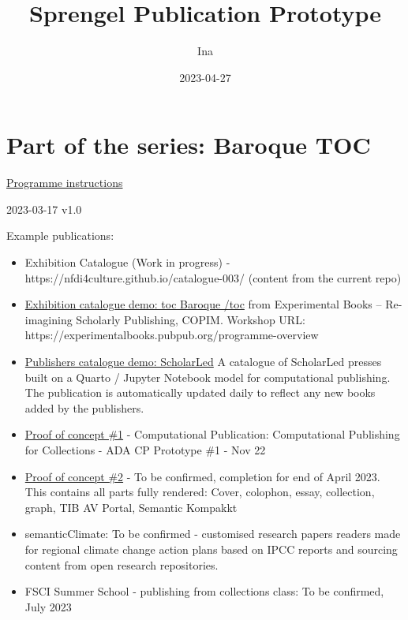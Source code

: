 \documentclass[
  letterpaper,
]{book}
\title{Sprengel Publication Prototype}
\author{Ina}
\date{2023-04-27}
\renewcommand*\contentsname{Table of contents}
\newcommand\contentsname{Table of contents}
\begin{document}
\frontmatter
\maketitle
\ifdefined\Shaded\renewenvironment{Shaded}{\begin{tcolorbox}[boxrule=0pt, frame hidden, interior hidden, breakable, enhanced, sharp corners, borderline west={3pt}{0pt}{shadecolor}]}{\end{tcolorbox}}\fi

\renewcommand*\contentsname{Table of contents}
{
\setcounter{tocdepth}{2}
\tableofcontents
}
\mainmatter
{}

\hypertarget{part-of-the-series-baroque-toc}{%
\chapter{Part of the series: Baroque
TOC}\label{part-of-the-series-baroque-toc}}

\href{https://nfdi4culture.github.io/class-ADA-CP-pipeline/}{Programme
instructions}

2023-03-17 v1.0

Example publications:

\begin{itemize}
\item
  Exhibition Catalogue (Work in progress) -
  https://nfdi4culture.github.io/catalogue-003/ (content from the
  current repo)
\item
  \href{https://nfdi4culture.github.io/experimental-books-workshop/}{Exhibition
  catalogue demo: toc Baroque /toc} from Experimental Books --
  Re-imagining Scholarly Publishing, COPIM. Workshop URL:
  https://experimentalbooks.pubpub.org/programme-overview
\item
  \href{https://simonxix.github.io/scholarled_catalogue/}{Publishers
  catalogue demo: ScholarLed} A catalogue of ScholarLed presses built on
  a Quarto / Jupyter Notebook model for computational publishing. The
  publication is automatically updated daily to reflect any new books
  added by the publishers.
\item
  \href{https://nfdi4culture.github.io/cp4c/}{Proof of concept \#1} -
  Computational Publication: Computational Publishing for Collections -
  ADA CP Prototype \#1 - Nov 22
\item
  \href{https://nfdi4culture.github.io/art_catalogue_test/}{Proof of
  concept \#2} - To be confirmed, completion for end of April 2023. This
  contains all parts fully rendered: Cover, colophon, essay, collection,
  graph, TIB AV Portal, Semantic Kompakkt
\item
  semanticClimate: To be confirmed - customised research papers readers
  made for regional climate change action plans based on IPCC reports
  and sourcing content from open research repositories.
\item
  FSCI Summer School - publishing from collections class: To be
  confirmed, July 2023
\end{itemize}
\end{document}
